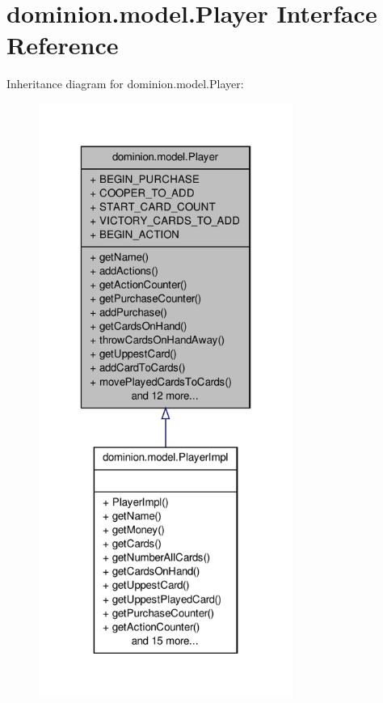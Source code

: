 \hypertarget{interfacedominion_1_1model_1_1Player}{\section{dominion.\-model.\-Player \-Interface \-Reference}
\label{interfacedominion_1_1model_1_1Player}
}


\-Inheritance diagram for dominion.\-model.\-Player\-:
\nopagebreak
\begin{figure}[H]
\begin{center}
\leavevmode
\includegraphics[height=550pt]{interfacedominion_1_1model_1_1Player__inherit__graph}
\end{center}
\end{figure}

